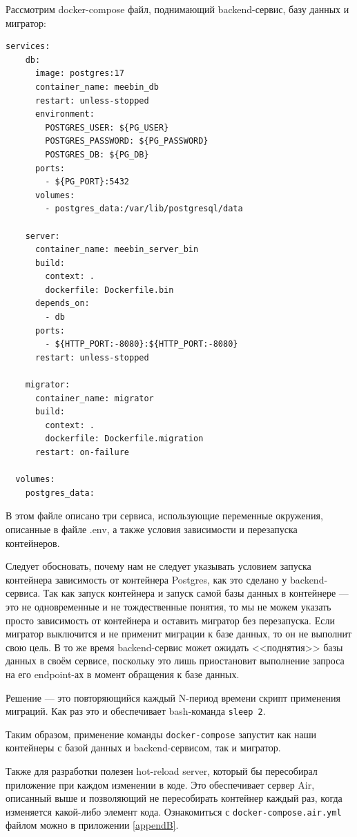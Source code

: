 \documentclass[diploma]{SCWorks}
\begin{document}
Рассмотрим docker-compose файл, поднимающий backend-сервис, базу данных и 
мигратор:
\begin{verbatim}
services:
    db:
      image: postgres:17
      container_name: meebin_db
      restart: unless-stopped
      environment:
        POSTGRES_USER: ${PG_USER}
        POSTGRES_PASSWORD: ${PG_PASSWORD}
        POSTGRES_DB: ${PG_DB}
      ports: 
        - ${PG_PORT}:5432
      volumes:
        - postgres_data:/var/lib/postgresql/data
  
    server:
      container_name: meebin_server_bin
      build:
        context: .
        dockerfile: Dockerfile.bin
      depends_on:
        - db
      ports:
        - ${HTTP_PORT:-8080}:${HTTP_PORT:-8080}
      restart: unless-stopped
  
    migrator:
      container_name: migrator
      build:
        context: .
        dockerfile: Dockerfile.migration
      restart: on-failure
  
  volumes:
    postgres_data:
\end{verbatim}

В этом файле описано три сервиса, использующие переменные окружения, описанные
в файле .env, а также условия зависимости и перезапуска контейнеров.

Следует обосновать, почему нам не следует указывать условием запуска контейнера
зависимость от контейнера Postgres, как это сделано у backend-сервиса. Так как
запуск контейнера и запуск самой базы данных в контейнере — это не одновременные
и не тождественные понятия, то мы не можем указать просто зависимость от 
контейнера и оставить мигратор без перезапуска. Если мигратор выключится и не 
применит миграции к базе данных, то он не выполнит свою цель. В то же время
backend-сервис может ожидать <<поднятия>> базы данных в своём сервисе, поскольку
это лишь приостановит выполнение запроса на его endpoint-ах в момент обращения
к базе данных.

Решение — это повторяющийся каждый N-период времени скрипт применения миграций.
Как раз это и обеспечивает bash-команда \texttt{sleep 2}.

Таким образом, применение команды \texttt{docker-compose} запустит как 
наши контейнеры с базой данных и backend-сервисом, так и мигратор.

Также для разработки полезен hot-reload server, который бы пересобирал 
приложение при каждом изменении в коде. Это обеспечивает сервер Air, описанный
выше и позволяющий не пересобирать контейнер каждый раз, когда изменяется 
какой-либо элемент кода. Ознакомиться с \texttt{docker-compose.air.yml} файлом 
можно в приложении \ref{appendB}.
\end{document}

